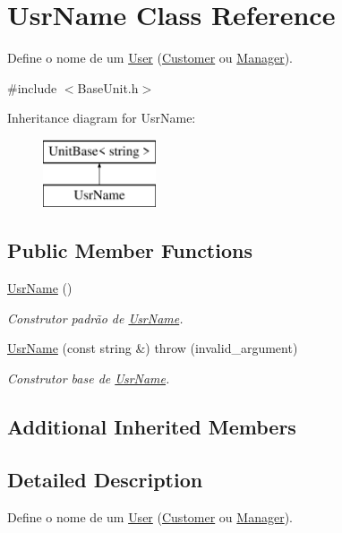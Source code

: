 \hypertarget{classUsrName}{\section{Usr\-Name Class Reference}
\label{da/df7/classUsrName}
}


Define o nome de um \hyperlink{classUser}{User} (\hyperlink{classCustomer}{Customer} ou \hyperlink{classManager}{Manager}).  




{\ttfamily \#include $<$Base\-Unit.\-h$>$}

Inheritance diagram for Usr\-Name\-:\begin{figure}[H]
\begin{center}
\leavevmode
\includegraphics[height=2.000000cm]{da/df7/classUsrName}
\end{center}
\end{figure}
\subsection*{Public Member Functions}
\begin{DoxyCompactItemize}
\item 
\hyperlink{classUsrName_a0b0d5b9167309872d29c60a1946375af}{Usr\-Name} ()
\begin{DoxyCompactList}\small\item\em Construtor padrão de \hyperlink{classUsrName}{Usr\-Name}. \end{DoxyCompactList}\item 
\hyperlink{classUsrName_a3028672b21248ef880a01e3621e02827}{Usr\-Name} (const string \&)  throw (invalid\-\_\-argument)
\begin{DoxyCompactList}\small\item\em Construtor base de \hyperlink{classUsrName}{Usr\-Name}. \end{DoxyCompactList}\end{DoxyCompactItemize}
\subsection*{Additional Inherited Members}


\subsection{Detailed Description}
Define o nome de um \hyperlink{classUser}{User} (\hyperlink{classCustomer}{Customer} ou \hyperlink{classManager}{Manager}). 

